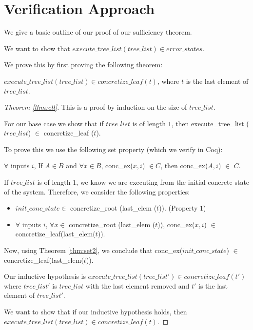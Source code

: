 \section{Verification Approach}
We give a basic outline of our proof of our sufficiency theorem.

We want to show that $execute\_tree\_list (tree\_list) \in error\_states$.

We prove this by first proving the following theorem:
\begin{theorem} \label{thm:etl}
 $execute\_tree\_list (tree\_list) \in concretize\_leaf (t)$, where $t$ is the last element of $tree\_list$.
\end{theorem}

\begin{proof}[Theorem \ref{thm:etl}]
This is a proof by induction on the size of $tree\_list$.

For our base case we show that if $tree\_list$ is of length $1$, then execute\_tree\_list ($tree\_list$) $\in$ concretize\_leaf ($t$).


To prove this we use the following set property (which we verify in Coq):

\begin{theorem}
\label{thm:set2}
$\forall$ inputs $i$,
If $A \in B$ and 
$\forall x \in B$, conc\_ex($x, i$) $\in C$, then  conc\_ex($A, i$) $\in$ $C$.
\end{theorem}

If $tree\_list$ is of length $1$, we know we are executing from the initial concrete state of the system. Therefore, we consider the following properties:
\begin{itemize}
\item $init\_conc\_state \in$ 
  concretize\_root (last\_elem ($t$)). (Property $1$)
 \item $ \forall$ inputs $i$, 
 $\forall x \in$
  concretize\_root (last\_elem ($t$)),  
  conc\_ex($x, i$) $\in$ concretize\_leaf(last\_elem($t$)).
\end{itemize}

Now, using Theorem \ref{thm:set2}, we conclude that conc\_ex($init\_conc\_state$) $\in$ concretize\_leaf(last\_elem($t$)).

Our inductive hypothesis is  $execute\_tree\_list (tree\_list') \in concretize\_leaf (t')$ where $tree\_list'$ is $tree\_list$ with the last element removed and $t'$ is the last element of $tree\_list'$.

We want to show that if our inductive hypothesis holds, then $execute\_tree\_list (tree\_list) \in concretize\_leaf (t)$.


\end{proof}
